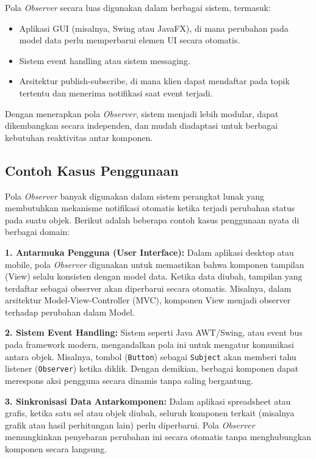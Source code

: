 Pola \textit{Observer} secara luas digunakan dalam berbagai sistem, termasuk:
\begin{itemize}
	\item Aplikasi GUI (misalnya, Swing atau JavaFX), di mana perubahan pada model data perlu memperbarui elemen UI secara otomatis.
	\item Sistem event handling atau sistem messaging.
	\item Arsitektur publish-subscribe, di mana klien dapat mendaftar pada topik tertentu dan menerima notifikasi saat event terjadi.
\end{itemize}

Dengan menerapkan pola \textit{Observer}, sistem menjadi lebih modular, dapat dikembangkan secara independen, dan mudah diadaptasi untuk berbagai kebutuhan reaktivitas antar komponen.

\subsection{Contoh Kasus Penggunaan}

Pola \textit{Observer} banyak digunakan dalam sistem perangkat lunak yang membutuhkan mekanisme notifikasi otomatis ketika terjadi perubahan status pada suatu objek. Berikut adalah beberapa contoh kasus penggunaan nyata di berbagai domain:

\textbf{1. Antarmuka Pengguna (User Interface):}  
Dalam aplikasi desktop atau mobile, pola \textit{Observer} digunakan untuk memastikan bahwa komponen tampilan (View) selalu konsisten dengan model data. Ketika data diubah, tampilan yang terdaftar sebagai observer akan diperbarui secara otomatis. Misalnya, dalam arsitektur Model-View-Controller (MVC), komponen View menjadi observer terhadap perubahan dalam Model.

\textbf{2. Sistem Event Handling:}  
Sistem seperti Java AWT/Swing, atau event bus pada framework modern, mengandalkan pola ini untuk mengatur komunikasi antara objek. Misalnya, tombol (\texttt{Button}) sebagai \texttt{Subject} akan memberi tahu listener (\texttt{Observer}) ketika diklik. Dengan demikian, berbagai komponen dapat merespons aksi pengguna secara dinamis tanpa saling bergantung.

\textbf{3. Sinkronisasi Data Antarkomponen:}  
Dalam aplikasi spreadsheet atau grafis, ketika satu sel atau objek diubah, seluruh komponen terkait (misalnya grafik atau hasil perhitungan lain) perlu diperbarui. Pola \textit{Observer} memungkinkan penyebaran perubahan ini secara otomatis tanpa menghubungkan komponen secara langsung.

